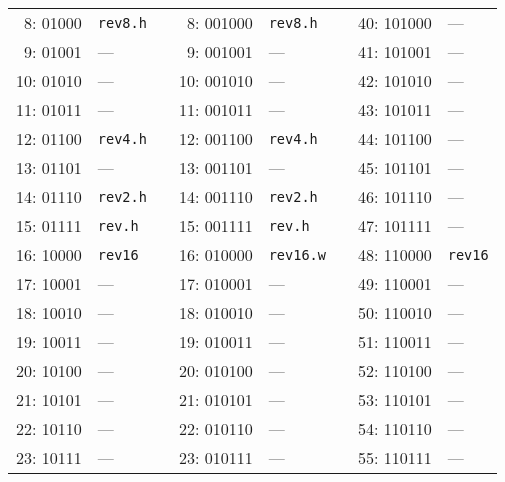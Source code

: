 \begin{table}[t]
\begin{small}
\begin{center}
\begin{tabular}{r l p{0.5in} r l p{0.3in} r l}
\cline{1-2}
\cline{4-5}
\cline{7-8}

 8: 01000 & {\tt rev8.h}  &   &  8: 001000 & {\tt rev8.h}  &   & 40: 101000 & ---         \\
 9: 01001 & ---           &   &  9: 001001 & ---           &   & 41: 101001 & ---         \\
10: 01010 & ---           &   & 10: 001010 & ---           &   & 42: 101010 & ---         \\
11: 01011 & ---           &   & 11: 001011 & ---           &   & 43: 101011 & ---         \\
12: 01100 & {\tt rev4.h}  &   & 12: 001100 & {\tt rev4.h}  &   & 44: 101100 & ---         \\
13: 01101 & ---           &   & 13: 001101 & ---           &   & 45: 101101 & ---         \\
14: 01110 & {\tt rev2.h}  &   & 14: 001110 & {\tt rev2.h}  &   & 46: 101110 & ---         \\
15: 01111 & {\tt rev.h}   &   & 15: 001111 & {\tt rev.h}   &   & 47: 101111 & ---         \\

\cline{1-2}
\cline{4-5}
\cline{7-8}

16: 10000 & {\tt rev16}   &   & 16: 010000 & {\tt rev16.w} &   & 48: 110000 & {\tt rev16} \\
17: 10001 & ---           &   & 17: 010001 & ---           &   & 49: 110001 & ---         \\
18: 10010 & ---           &   & 18: 010010 & ---           &   & 50: 110010 & ---         \\
19: 10011 & ---           &   & 19: 010011 & ---           &   & 51: 110011 & ---         \\
20: 10100 & ---           &   & 20: 010100 & ---           &   & 52: 110100 & ---         \\
21: 10101 & ---           &   & 21: 010101 & ---           &   & 53: 110101 & ---         \\
22: 10110 & ---           &   & 22: 010110 & ---           &   & 54: 110110 & ---         \\
23: 10111 & ---           &   & 23: 010111 & ---           &   & 55: 110111 & ---         \\

\cline{1-2}
\cline{4-5}
\cline{7-8}


\end{tabular}
\end{center}
\end{small}
\end{table}
